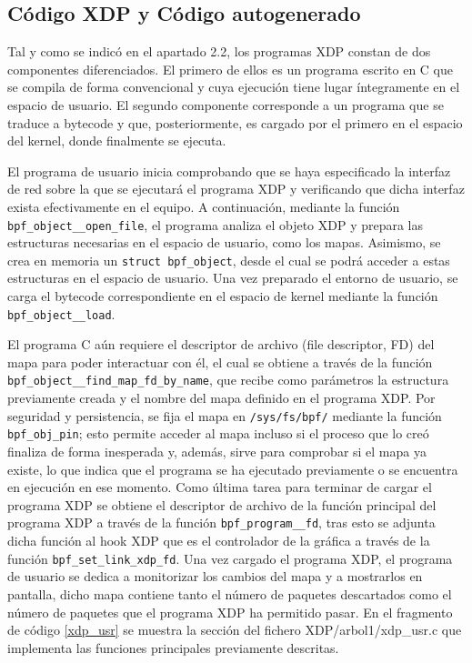 \subsection{Código XDP y Código autogenerado}
Tal y como se indicó en el apartado 2.2, los programas XDP constan de dos componentes diferenciados. El primero de ellos es un programa escrito en C que se compila de forma convencional y cuya ejecución tiene lugar íntegramente en el espacio de usuario. El segundo componente corresponde a un programa que se traduce a bytecode y que, posteriormente, es cargado por el primero en el espacio del kernel, donde finalmente se ejecuta.

El programa de usuario inicia comprobando que se haya especificado la interfaz de red sobre la que se ejecutará el programa XDP y verificando que dicha interfaz exista efectivamente en el equipo. A continuación, mediante la función \verb|bpf_object__open_file|, el programa analiza el objeto XDP y prepara las estructuras necesarias en el espacio de usuario, como los mapas. Asimismo, se crea en memoria un \verb|struct bpf_object|, desde el cual se podrá acceder a estas estructuras en el espacio de usuario. Una vez preparado el entorno de usuario, se carga el bytecode correspondiente en el espacio de kernel mediante la función \verb|bpf_object__load|.

El programa C aún requiere el descriptor de archivo (file descriptor, FD) del mapa para poder interactuar con él, el cual se obtiene a través de la función \verb|bpf_object__find_map_fd_by_name|, que recibe como parámetros la estructura previamente creada y el nombre del mapa definido en el programa XDP. Por seguridad y persistencia, se fija el mapa en \verb|/sys/fs/bpf/| mediante la función \verb|bpf_obj_pin|; esto permite acceder al mapa incluso si el proceso que lo creó finaliza de forma inesperada y, además, sirve para comprobar si el mapa ya existe, lo que indica que el programa se ha ejecutado previamente o se encuentra en ejecución en ese momento. Como última tarea para terminar de cargar el programa XDP se obtiene el descriptor de archivo de la función principal del programa XDP a través de la función \verb|bpf_program__fd|, tras esto se adjunta dicha función al hook XDP que es el controlador de la gráfica a través de la función \verb|bpf_set_link_xdp_fd|. Una vez cargado el programa XDP, el programa de usuario se dedica a monitorizar los cambios del mapa y a mostrarlos en pantalla, dicho mapa contiene tanto el número de paquetes descartados como el número de paquetes que el programa XDP ha permitido pasar. En el fragmento de código \ref{xdp_usr} se muestra la sección del fichero XDP/arbol1/xdp\_usr.c que implementa las funciones principales previamente descritas.

